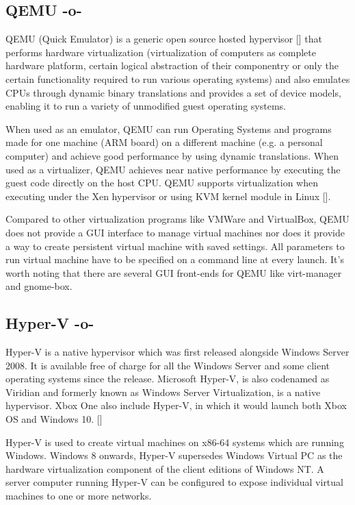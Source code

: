 \subsection{QEMU -o-}
     
QEMU (Quick Emulator) is a generic open source hosted
hypervisor [\cite{www-hypervisor}] that performs hardware virtualization
(virtualization of computers as complete hardware platform, certain
logical abstraction of their componentry or only the certain
functionality required to run various operating systems)
\cite{www-qemu} and also emulates CPUs through dynamic binary
translations and provides a set of device models, enabling it to run a
variety of unmodified guest operating systems.
     
When used as an emulator, QEMU can run Operating Systems and programs
made for one machine (ARM board) on a different machine (e.g. a
personal computer) and achieve good performance by using dynamic
translations.  When used as a virtualizer, QEMU achieves near native
performance by executing the guest code directly on the host CPU. QEMU
supports virtualization when executing under the Xen hypervisor or
using KVM kernel module in Linux [\cite{www-qemuwiki}].

Compared to other virtualization programs like VMWare and VirtualBox,
QEMU does not provide a GUI interface to manage virtual machines nor
does it provide a way to create persistent virtual machine with saved
settings. All parameters to run virtual machine have to be specified
on a command line at every launch. It's worth noting that there are
several GUI front-ends for QEMU like virt-manager and gnome-box.



\subsection{Hyper-V -o-}
     
Hyper-V is a native hypervisor which was first released alongside
Windows Server 2008. It is available free of charge for all the
Windows Server and some client operating systems since the
release. Microsoft Hyper-V, is also codenamed as Viridian and formerly
known as Windows Server Virtualization, is a native hypervisor. Xbox
One also include Hyper-V, in which it would launch both Xbox OS and
Windows 10. [\cite{www-hyper-v-wikipedia}]

Hyper-V is used to create virtual machines on x86-64 systems which are
running Windows. Windows 8 onwards, Hyper-V supersedes Windows Virtual
PC as the hardware virtualization component of the client editions of
Windows NT. A server computer running Hyper-V can be configured to
expose individual virtual machines to one or more networks.

